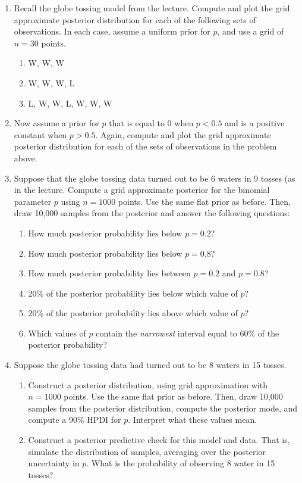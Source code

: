 \documentclass[10pt]{article}
\begin{document}
\begin{enumerate}
  
\item Recall the globe tossing model from the lecture.  Compute and plot the grid approximate posterior distribution for each of the following sets of observations.  In each case, assume a uniform prior for $p$, and use a grid of $n=30$ points.
  \begin{enumerate}
  \item W, W, W
  \item W, W, W, L
  \item L, W, W, L, W, W, W
  \end{enumerate}

\item Now assume a prior for $p$ that is equal to 0 when $p<0.5$ and is a positive constant when $p>0.5$.  Again, compute and plot the grid approximate posterior distribution for each of the sets of observations in the problem above.

\item Suppose that the globe tossing data turned out to be 6 waters in 9 tosses (as in the lecture. Compute a grid approximate posterior for the binomial parameter $p$ using $n=1000$ points.  Use the same flat prior as before.  Then, draw 10,000 samples from the posterior and answer the following questions:
  \begin{enumerate}
  \item How much posterior probability lies below $p=0.2$?
  \item How much posterior probability lies below $p=0.8$?
  \item How much posterior probability lies between $p=0.2$ and $p=0.8$?
  \item 20\% of the posterior probability lies below which value of $p$?
  \item 20\% of the posterior probability lies above which value of $p$?
    \item Which values of $p$ contain the \emph{narrowest} interval equal to 60\% of the posterior probability?
    \end{enumerate}

  \item Suppose the globe tossing data had turned out to be 8 waters in 15 tosses.

    \begin{enumerate}
    \item Construct a posterior distribution, using grid approximation with $n=1000$ points.  Use the same flat prior as before.  Then, draw 10,000 samples from the posterior distribution, compute the posterior mode, and compute a 90\% HPDI for $p$.  Interpret what these values mean.
      \item Construct a posterior predictive check for this model and data. That is, simulate the distribution of samples, averaging over the posterior uncertainty in $p$.  What is the probability of observing 8 water in 15 tosses?


\end{enumerate}
\end{enumerate}
\end{document}
